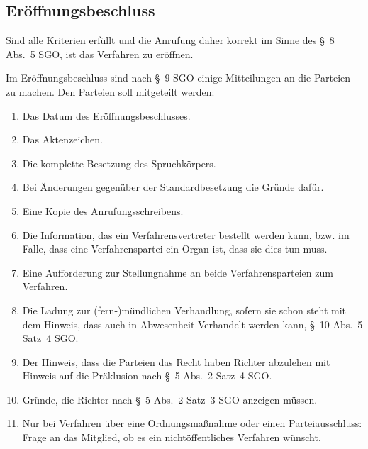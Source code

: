 \subsection{Eröffnungsbeschluss}
\label{Standardworkflow:Beschluss:Eroeffnung}
Sind alle Kriterien erfüllt und die Anrufung daher korrekt im Sinne des \S~8 Abs.~5 SGO, ist das Verfahren zu eröffnen.

Im Eröffnungsbeschluss sind nach \S~9 SGO einige Mitteilungen an die Parteien zu machen.
Den Parteien soll mitgeteilt werden:
\begin{enumerate}
\item Das Datum des Eröffnungsbeschlusses.
\item Das Aktenzeichen.
\item Die komplette Besetzung des Spruchkörpers.
\item Bei Änderungen gegenüber der Standardbesetzung die Gründe dafür.
\item Eine Kopie des Anrufungsschreibens.
\item Die Information, das ein Verfahrensvertreter bestellt werden kann, bzw. im Falle, dass eine Verfahrenspartei ein Organ ist, dass sie dies tun muss.
\item Eine Aufforderung zur Stellungnahme an beide Verfahrensparteien zum Verfahren.
\item Die Ladung zur (fern-)mündlichen Verhandlung, sofern sie schon steht mit dem Hinweis, dass auch in Abwesenheit Verhandelt werden kann, \S~10 Abs.~5 Satz~4 SGO.
\item Der Hinweis, dass die Parteien das Recht haben Richter abzulehen mit Hinweis auf die Präklusion nach \S~5 Abs.~2 Satz~4 SGO.
\item Gründe, die Richter nach \S~5 Abs.~2 Satz~3 SGO anzeigen müssen.
\item Nur bei Verfahren über eine Ordnungsmaßnahme oder einen Parteiausschluss: Frage an das Mitglied, ob es ein nichtöffentliches Verfahren wünscht.
\end{enumerate}

\chapterbib
